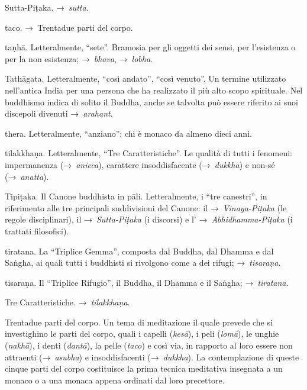 \begin{glossarydescription}
\item[Sutta-Piṭaka.] →~\emph{sutta}.


\item[taco.] →~Trentadue parti del corpo.

\item[taṇhā.] Letteralmente, ``sete''. Bramosia per gli oggetti dei sensi,
  per l'esistenza o per la non esistenza; →~\emph{bhava}, →~\emph{lobha}.

\item[Tathāgata.] Letteralmente, ``così andato'', ``così venuto''. Un
  termine utilizzato nell'antica India per una persona che ha realizzato il più
  alto scopo spirituale. Nel buddhismo indica di solito il Buddha, anche se
  talvolta può essere riferito ai suoi discepoli divenuti →~\emph{arahant}.

\item[thera.] Letteralmente, ``anziano''; chi è monaco da almeno dieci
  anni.

\item[tilakkhaṇa.]\label{glossary-tilakkhana} Letteralmente, ``Tre Caratteristiche''. Le qualità di
  tutti i fenomeni: impermanenza (→~\emph{anicca}), carattere insoddisfacente
  (→~\emph{dukkha}) e non-sé (→~\emph{anatta}).

\item[Tipiṭaka.] Il Canone buddhista in pāli. Letteralmente, i ``tre
  canestri'', in riferimento alle tre principali suddivisioni del Canone: il
  →~\emph{Vinaya-Piṭaka} (le regole disciplinari), il →~\emph{Sutta-Piṭaka} (i
  discorsi) e l' →~\emph{Abhidhamma-Piṭaka} (i trattati filosofici).

\item[tiratana.] La ``Triplice Gemma'', composta dal Buddha, dal Dhamma e
  dal Saṅgha, ai quali tutti i buddhisti si rivolgono come a dei rifugi;
  →~\emph{tisaraṇa}.

\item[tisaraṇa.] Il ``Triplice Rifugio'', il Buddha, il Dhamma e il
  Saṅgha; →~\emph{tiratana}.

\item[Tre Caratteristiche.] →~\emph{tilakkhaṇa}.

\item[Trentadue parti del corpo.] Un tema di meditazione il quale prevede che si
  investighino le parti del corpo, quali i capelli (\emph{kesā}), i peli
  (\emph{lomā}), le unghie (\emph{nakhā}), i denti (\emph{dantā}), la pelle
  (\emph{taco}) e così via, in rapporto al loro essere non attraenti
  (→~\emph{asubha}) e insoddisfacenti (→~\emph{dukkha}). La contemplazione di
  queste cinque parti del corpo costituisce la prima tecnica meditativa
  insegnata a un monaco o a una monaca appena ordinati dal loro precettore.


\end{glossarydescription}
